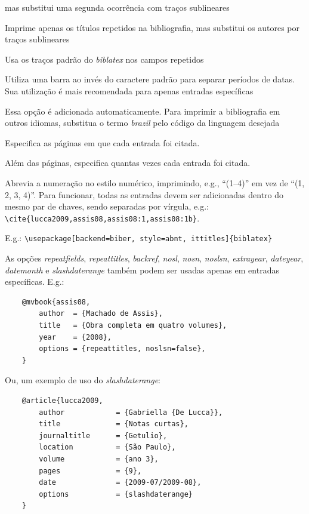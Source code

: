 \documentclass[a4paper]{article}
\begin{document}
\begin{description}[itemindent=-1em,leftmargin=3em]
    mas substitui uma segunda ocorrência com traços sublineares
  \item [repeattitles] Imprime apenas os títulos repetidos na bibliografia,
    mas substitui os autores por traços sublineares
  \item [usedashes] Usa os traços padrão do \textit{biblatex} nos campos
    repetidos
  \item [slashdaterange] Utiliza uma barra ao invés do caractere padrão para separar períodos de datas. Sua utilização é mais recomendada para apenas entradas específicas
  \item [language=brazil] Essa opção é adicionada automaticamente. Para
    imprimir a bibliografia em outros idiomas, substitua o termo
    \textit{brazil} pelo código da linguagem desejada
  \item [backref] Especifica as páginas em que cada entrada foi citada.
  \item [citecount] Além das páginas, especifica quantas vezes cada entrada
    foi citada.
  \item [comp] Abrevia a numeração no estilo numérico, imprimindo, e.g.,
    \enquote{(1--4)} em vez de \enquote{(1, 2, 3, 4)}. Para funcionar, todas as entradas devem ser adicionadas dentro do mesmo par de chaves, sendo separadas por vírgula, e.g.: \verb|\cite{lucca2009,assis08,assis08:1,assis08:1b}|.
\end{description}%

\vspace{\baselineskip}
E.g.: \verb"\usepackage[backend=biber, style=abnt, ittitles]{biblatex}"

\begin{sloppypar}
  As opções \textit{repeatfields}, \textit{repeattitles}, \textit{backref},
  \textit{nosl}, \textit{nosn}, \textit{noslsn}, \textit{extrayear}, \textit{dateyear}, \textit{datemonth} e \textit{slashdaterange} também
  podem ser usadas apenas em entradas específicas. E.g.:
\end{sloppypar}

\begin{verbatim}
    @mvbook{assis08,
        author  = {Machado de Assis},
        title   = {Obra completa em quatro volumes},
        year    = {2008},
        options = {repeattitles, noslsn=false},
    }
\end{verbatim}

Ou, um exemplo de uso do \textit{slashdaterange}:
\begin{verbatim}
    @article{lucca2009,
        author            = {Gabriella {De Lucca}},
        title             = {Notas curtas},
        journaltitle      = {Getulio},
        location          = {São Paulo},
        volume            = {ano 3},
        pages             = {9},
        date              = {2009-07/2009-08},  
        options           = {slashdaterange}
    }
\end{verbatim}
\end{document}
